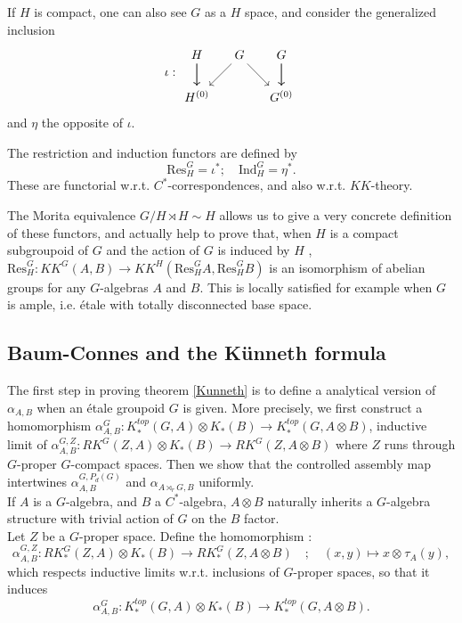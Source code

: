 If $H$ is compact, one can also see $G$ as a $H$ space, and consider the generalized inclusion  
\[\iota : 
\begin{tikzcd}[column sep = small] 
H \arrow{d} \arrow{d} & \arrow{dl} G \arrow{dr} & G\arrow{d} \arrow{d} \\
 H^{(0)} & & G^{(0)}
\end{tikzcd}\]
and $\eta$ the opposite of $\iota$.  
\begin{definition}
The restriction and induction functors are defined by
\[ \text{Res}_H^G = \iota^*;\quad \text{Ind}_H^G = \eta^*.\]
These are functorial w.r.t. $C^*$-correspondences, and also w.r.t. $KK$-theory.
\end{definition}

The Morita equivalence $G/H\rtimes H \sim H$ allows us to give a very concrete definition of these functors, and actually help to prove that, when $H$ is a compact subgroupoid of $G$ and the action of $G$ is induced by $H$ , $\text{Res}_{H}^G : KK^G(A,B)\rightarrow KK^H( \text{Res}_{H}^G A , \text{Res}_{H}^G B)$ is an isomorphism of abelian groups for any $G$-algebras $A$ and $B$. This is locally satisfied for example when $G$ is ample, i.e. étale with totally disconnected base space.

\subsection{Baum-Connes and the Künneth formula}

The first step in proving theorem \ref{Kunneth} is to define a analytical version of $\alpha_{A,B}$ when an étale groupoid $G$ is given. More precisely, we first construct a homomorphism $\alpha_{A,B}^G : K_*^{top}(G,A)\otimes K_*(B)\rightarrow K_*^{top}(G,A\otimes B )$, inductive limit of $\alpha_{A,B}^{G,Z} : RK^G(Z,A)\otimes K_*(B)\rightarrow RK^G(Z,A\otimes B )$ where $Z$ runs through $G$-proper $G$-compact spaces. Then we show that the controlled assembly map intertwines $\alpha^{G,P_d(G)}_{A,B}$ and $\alpha_{A\rtimes_r G,B}$ uniformly.\\

If $A$ is a $G$-algebra, and $B$ a $C^*$-algebra, $A\otimes B$ naturally inherits a $G$-algebra structure with trivial action of $G$ on the $B$ factor.\\

Let $Z$ be a $G$-proper space. Define the homomorphism :
\[\alpha_{A,B}^{G,Z} : RK^G_*(Z,A)\otimes K_*(B)\rightarrow RK_*^G(Z,A\otimes B) \quad ; \quad (x,y)\mapsto x\otimes_{}   \tau_A(y),\]
which respects inductive limits w.r.t. inclusions of $G$-proper spaces, so that it induces
\[\alpha_{A,B}^G : K_*^{top}(G,A)\otimes K_*(B)\rightarrow K_*^{top}(G,A\otimes B ).\]

